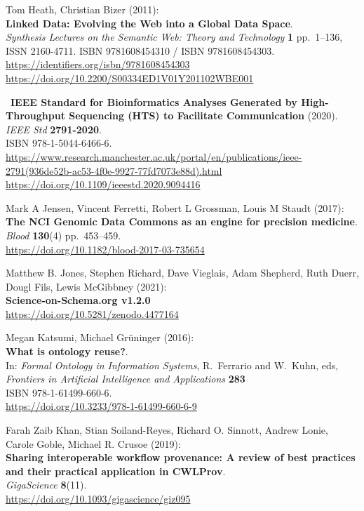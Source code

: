 Tom Heath, Christian Bizer (2011):\\
\textbf{Linked Data: Evolving the Web into a Global Data Space}.\\
\emph{Synthesis Lectures on the Semantic Web: Theory and Technology}
\textbf{1} pp.~1--136, ISSN 2160-4711. ISBN 9781608454310 / ISBN
9781608454303. \url{https://identifiers.org/isbn/9781608454303}\\
\url{https://doi.org/10.2200/S00334ED1V01Y201102WBE001}

~\textbf{IEEE Standard for Bioinformatics Analyses Generated by
High-Throughput Sequencing (HTS) to Facilitate Communication} (2020).\\
\emph{IEEE Std} \textbf{2791-2020}.\\
ISBN 978-1-5044-6466-6.\\
\url{https://www.research.manchester.ac.uk/portal/en/publications/ieee-2791(936de52b-ac53-4f0e-9927-77fd7073e88d).html}\\
\url{https://doi.org/10.1109/ieeestd.2020.9094416}

Mark A Jensen, Vincent Ferretti, Robert L Grossman, Louis M
Staudt (2017):\\
\textbf{The NCI Genomic Data Commons as an engine for precision
medicine}.\\
\emph{Blood} \textbf{130}(4) pp.~453--459.\\
\url{https://doi.org/10.1182/blood-2017-03-735654}

Matthew B. Jones, Stephen Richard, Dave Vieglais, Adam
Shepherd, Ruth Duerr, Dougl Fils, Lewis McGibbney (2021):\\
\textbf{Science-on-Schema.org v1.2.0}\\
\url{https://doi.org/10.5281/zenodo.4477164}

Megan Katsumi, Michael Grüninger (2016):\\
\textbf{What is ontology reuse?}.\\
In: \emph{Formal Ontology in Information Systems}, R.~Ferrario and
W.~Kuhn, eds,\\
\emph{Frontiers in Artificial Intelligence and Applications}
\textbf{283}\\
ISBN 978-1-61499-660-6.\\
\url{https://doi.org/10.3233/978-1-61499-660-6-9}

Farah Zaib Khan, Stian Soiland-Reyes, Richard O. Sinnott,
Andrew Lonie, Carole Goble, Michael R. Crusoe (2019):\\
\textbf{Sharing interoperable workflow provenance: A review of best
practices and their practical application in CWLProv}.\\
\emph{GigaScience} \textbf{8}(11).\\
\url{https://doi.org/10.1093/gigascience/giz095}

